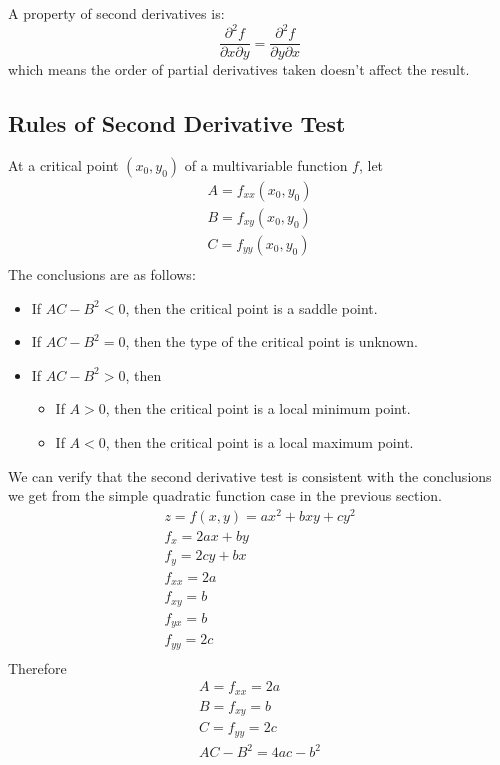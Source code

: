 \documentclass{article}
\begin{document}
A property of second derivatives is:
\begin{equation*}
  \frac{\partial^2 f}{\partial x \partial y} = \frac{\partial^2 f}{\partial y \partial x}
\end{equation*}
which means the order of partial derivatives taken doesn't affect the result.

\subsection{Rules of Second Derivative Test}

At a critical point $(x_0, y_0)$ of a multivariable function $f$, let
\begin{gather*}
  A = f_{xx}(x_0, y_0) \\
  B = f_{xy}(x_0, y_0) \\
  C = f_{yy}(x_0, y_0) \\
\end{gather*}
The conclusions are as follows:
\begin{itemize}
  \item If $AC - B^2 < 0$, then the critical point is a saddle point.
  \item If $AC - B^2 = 0$, then the type of the critical point is unknown.
  \item If $AC - B^2 > 0$, then
    \begin{itemize}
      \item If $A > 0$, then the critical point is a local minimum point.
      \item If $A < 0$, then the critical point is a local maximum point.
    \end{itemize}
\end{itemize}

We can verify that the second derivative test is consistent with the conclusions 
we get from the simple quadratic function case in the previous section.
\begin{gather*}
  z = f(x, y) = ax^2 + bxy + cy^2 \\
  f_x = 2ax + by \\
  f_y = 2cy + bx \\
  f_{xx} = 2a \\
  f_{xy} = b \\
  f_{yx} = b \\
  f_{yy} = 2c \\
\end{gather*}
Therefore
\begin{gather*}
  A = f_{xx} = 2a \\
  B = f_{xy} = b \\
  C = f_{yy} = 2c \\
  AC - B^2 = 4ac - b^2 \\
\end{gather*}
\end{document}
